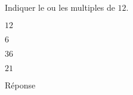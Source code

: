 \begin{exercice}
    Indiquer le ou les multiples de $12$.
    \begin{ChoixQCM}{4}
        \item $12$
        \item $6$
        \item $36$
        \item $21$
    \end{ChoixQCM}
\end{exercice}
\begin{corrige}
    Réponse  
\end{corrige}